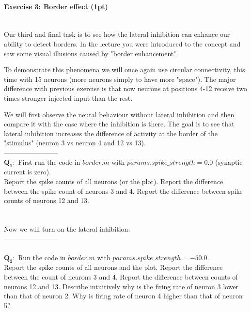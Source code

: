 \documentclass[a4paper,11pt]{article}
\newenvironment{exercise}[3]{\paragraph{Exercise #1: #2 (#3pt)}\ \\}{
\medskip}
\newcommand{\question}[2]{\setlength\parindent{10mm}\ \\$\mathbf{Q_#1:}$ #2\ \\}
\begin{document}
%
%
\begin{exercise}{3}{Border effect}{1}
Our third and final task is to see how the lateral inhibition can enhance our ability to detect borders. In the lecture you were introduced to the concept and saw some visual illusions caused by "border enhancement".

To demonstrate this phenomena we will once again use circular connectivity, this time with 15 neurons (more neurons simply to have more "space"). The major difference with previous exercise is that now neurons at positions 4-12 receive two times stronger injected input than the rest.

We will first observe the neural behaviour without lateral inhibition and then compare it with the case where the inhibition is there. The goal is to see that lateral inhibition increases the difference of activity at the border of the "stimulus" (neuron 3 vs neuron 4 and 12 vs 13).\\
------------------------
\question{1}{First run the code in $border.m$ with $params.spike\_strength = 0.0$ (synaptic current is zero).\\ Report the spike counts of all neurons (or the plot). Report the difference between the spike count of neurons 3 and 4. Report the difference between spike counts of neurons 12 and 13.}
------------------------\\
\ \\
Now we will turn on the lateral inhibition:\\
------------------------\\
\question{2}{Run the code in $border.m$ with $params.spike\_strength = -50.0$.\\
Report the spike counts of all neurons and the plot. Report the difference between the count of neurons 3 and 4. Report the difference between counts of neurons 12 and 13. Describe intuitively why is the firing rate of neuron 3 lower than that of neuron 2. Why is firing rate of neuron 4 higher than that of neuron 5?}
\end{exercise}
\end{document}
